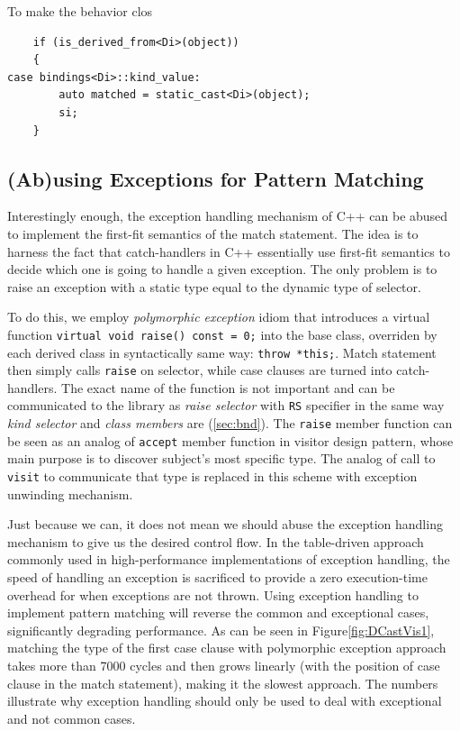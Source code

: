 \documentclass[preprint]{sigplanconf}
\makeatletter
\DeclareRobustCommand{\code}[1]{{\lstinline[breaklines=false,escapechar=@]{#1}}}
\makeatother
\begin{document}
To make the behavior clos

\begin{lstlisting}
    if (is_derived_from<Di>(object))
    {
case bindings<Di>::kind_value:
        auto matched = static_cast<Di>(object); 
        si;
    }
\end{lstlisting}


\subsection{(Ab)using Exceptions for Pattern Matching}
\label{sec:xpm}

Interestingly enough, the exception handling mechanism of C++ can be abused to 
implement the first-fit semantics of the match statement. The idea is to harness 
the fact that catch-handlers in C++ essentially use first-fit semantics to 
decide which one is going to handle a given exception. The only problem is to 
raise an exception with a static type equal to the dynamic type of selector.

To do this, we employ \emph{polymorphic exception} idiom\cite{PolyExcept} that 
introduces a virtual function \code{virtual void raise() const = 0;} into the 
base class, overriden by each derived class in syntactically same way: 
\code{throw *this;}. Match statement then simply calls \code{raise} on selector, 
while case clauses are turned into catch-handlers.
The exact name of the function is not important and can be communicated to the 
library as \emph{raise selector} with \code{RS} specifier in the same way 
\emph{kind selector} and \emph{class members} are (\textsection\ref{sec:bnd}). 
The \code{raise} member function can be seen as an analog of \code{accept} 
member function in visitor design pattern, whose main purpose is to discover 
subject's most specific type. The analog of call to \code{visit} to communicate 
that type is replaced in this scheme with exception unwinding mechanism.

Just because we can, it does not mean we should abuse the exception handling 
mechanism to give us the desired control flow. In the table-driven approach 
commonly used in high-performance implementations of exception handling, the 
speed of handling an exception is sacrificed to provide a zero execution-time 
overhead for when exceptions are not thrown\cite{Schilling98}. Using exception 
handling to implement pattern matching will reverse the common and exceptional 
cases, significantly degrading performance. As can be seen in 
Figure\ref{fig:DCastVis1}, matching the type of the first case clause with 
polymorphic exception approach takes more than 7000 cycles and then grows 
linearly (with the position of case clause in the match statement), making it the 
slowest approach. The numbers illustrate why exception handling should only be 
used to deal with exceptional and not common cases.
\end{document}
